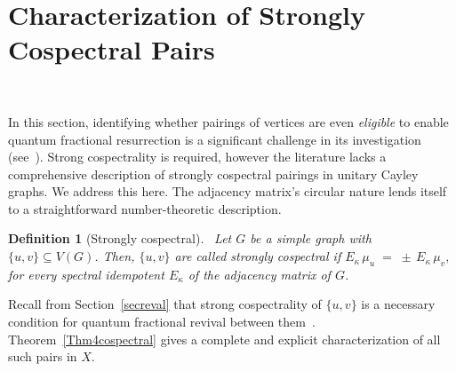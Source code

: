 \documentclass[12pt]{amsart}
\newtheorem{definition}{Definition}
\begin{document}
\section{Characterization of Strongly Cospectral Pairs}~\label{secCospectral}

In this section, identifying whether pairings of vertices are even \emph{eligible} to enable quantum fractional resurrection is a significant challenge in its investigation (see~\cite{basic2013, wang2024cayley}). Strong cospectrality is required, however the literature lacks a comprehensive description of strongly cospectral pairings in unitary Cayley graphs. We address this here. The adjacency matrix's circular nature lends itself to a straightforward number-theoretic description.

\begin{definition}[Strongly cospectral]~\label{def01cospectral}
Let $G$ be  a simple graph with $\{u,v\}\subseteq V(G)$. Then, $\{u,v\}$ are called  strongly cospectral if $E_{\kappa}\, \mu_u \;=\; \pm\, E_{\kappa}\, \mu_v,$ for every spectral idempotent $E_{\kappa}$ of the adjacency matrix of $G$.
\end{definition}

Recall from Section~\ref{secreval} that strong cospectrality of $\{u,v\}$ is a necessary condition for
quantum fractional revival between them~\cite{soni2025original,chan2022fundamentals}. Theorem~\ref{Thm4cospectral} gives a complete and explicit characterization of all such pairs in
$X$.
\end{document}
